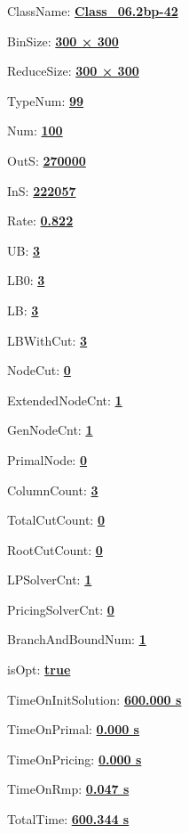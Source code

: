 \documentclass[11pt]{article}
\begin{document}
\pagestyle{empty}


ClassName: \underline{\textbf{Class_06.2bp-42}}
\par
BinSize: \underline{\textbf{300 × 300}}
\par
ReduceSize: \underline{\textbf{300 × 300}}
\par
TypeNum: \underline{\textbf{99}}
\par
Num: \underline{\textbf{100}}
\par
OutS: \underline{\textbf{270000}}
\par
InS: \underline{\textbf{222057}}
\par
Rate: \underline{\textbf{0.822}}
\par
UB: \underline{\textbf{3}}
\par
LB0: \underline{\textbf{3}}
\par
LB: \underline{\textbf{3}}
\par
LBWithCut: \underline{\textbf{3}}
\par
NodeCut: \underline{\textbf{0}}
\par
ExtendedNodeCnt: \underline{\textbf{1}}
\par
GenNodeCnt: \underline{\textbf{1}}
\par
PrimalNode: \underline{\textbf{0}}
\par
ColumnCount: \underline{\textbf{3}}
\par
TotalCutCount: \underline{\textbf{0}}
\par
RootCutCount: \underline{\textbf{0}}
\par
LPSolverCnt: \underline{\textbf{1}}
\par
PricingSolverCnt: \underline{\textbf{0}}
\par
BranchAndBoundNum: \underline{\textbf{1}}
\par
isOpt: \underline{\textbf{true}}
\par
TimeOnInitSolution: \underline{\textbf{600.000 s}}
\par
TimeOnPrimal: \underline{\textbf{0.000 s}}
\par
TimeOnPricing: \underline{\textbf{0.000 s}}
\par
TimeOnRmp: \underline{\textbf{0.047 s}}
\par
TotalTime: \underline{\textbf{600.344 s}}
\par
\newpage
\end{document}
